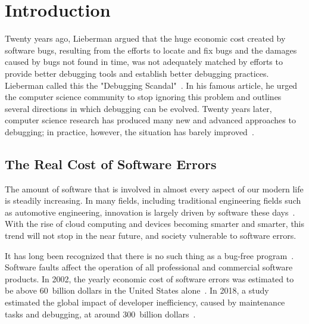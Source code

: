 \chapter{Introduction}
\label{sec:introduction}

Twenty years ago, Lieberman 
argued that the huge economic cost created by software bugs, resulting from the efforts to locate and fix bugs and the damages caused by bugs  not found in time, was not adequately matched by efforts to provide better debugging tools and establish better debugging practices.
Lieberman called this the "Debugging Scandal"~\cite{lieberman97:the_debugging_scandal}.
In his famous article, he urged the computer science community to stop ignoring this problem and outlines several directions in which debugging can be evolved.
Twenty years later, computer science research has produced many new and advanced approaches to debugging; in practice, however, the situation has barely improved~\cite{yin11:debugging_scandal_the_next, perscheid17:studying_the_advancement}.

\section{The Real Cost of Software Errors}

The amount of software that is involved in almost every aspect of our modern life is steadily increasing.
In many fields, including traditional engineering fields such as automotive engineering, innovation is largely driven by software these days~\cite{evans08:invisible_engines_how_software, gorschek10:a_lightweight_innovation_process}.
With the rise of cloud computing and devices becoming smarter and smarter, this trend will not stop in the near future, and society vulnerable to software errors.


It has long been recognized that there is no such thing as a bug-free program~\cite{schwartz71:an_overview_of_bugs}.
Software faults affect the operation of all professional and commercial software products.
In 2002, the yearly economic cost of software errors was estimated to be above 60~billion dollars in the United States alone~\cite{tassey02:the_economic_impacts}. 
In 2018, a study estimated the global impact of developer inefficiency, caused by maintenance tasks and debugging, at around 300~billion dollars~\cite{stripe18:the_developer_coefficient}.

